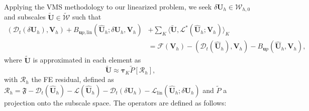 \documentclass[11pt,english]{article}
\def\disp{\boldsymbol{u}}
\def\SpaceTotal{\boldsymbol{\mathcal{W}}}
\def\TestFunctions{\boldsymbol{V}}
\def\UnkVariables{\boldsymbol{U}}
\def\D{\mathcal{D}}
\def\L{\mathcal{L}}
\def\DerL{\mathcal{L}_{\text{lin}}}
\def\DerBmixedLIN{B_{\disp p, \text{lin}}}
\def\Bmixed{B_{\disp p}}
\begin{document}
    \noindent Applying the VMS methodology to our linearized problem, we seek $\delta \UnkVariables_h \in \SpaceTotal_{h,0}$ and subscales $\tilde{\UnkVariables} \in \tilde{\SpaceTotal}$ such that
    \begin{align}
        (\mathcal{D}_t(\delta \UnkVariables_h),\TestFunctions_h) + \DerBmixedLIN(\hat{\UnkVariables}_h;\delta \UnkVariables_h,\TestFunctions_h) 
        &+ \sum_K \langle \tilde{\UnkVariables}, \mathcal{L}^*(\hat{\UnkVariables}_h;\TestFunctions_h)\rangle_K \nonumber \\
        &= \mathcal{F}(\TestFunctions_h) - (\mathcal{D}_t(\hat{\UnkVariables}_h),\TestFunctions_h) - \Bmixed(\hat{\UnkVariables}_h,\TestFunctions_h),
    \end{align}
    where $\tilde{\UnkVariables}$ is approximated in each element as
    \begin{equation}
        \tilde{\UnkVariables} \approx \boldsymbol{\tau}_K \tilde{P}[\mathcal{R}_h],
    \end{equation}
    with $\mathcal{R}_h$ the FE residual, defined as 
    $\mathcal{R}_h=\mathfrak{F}-\D_t(\hat{\UnkVariables}_h)-\L(\hat{\UnkVariables}_h)-\D_t\left(\delta\UnkVariables_h\right)-\DerL(\hat{\UnkVariables}_h;\delta\UnkVariables_h)$ and $\tilde{P}$ a projection onto the subscale space. The operators are defined as follows:
\end{document}
